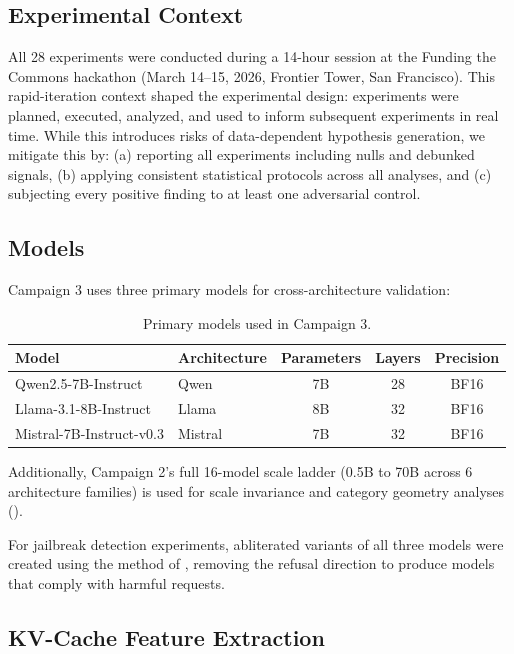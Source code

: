 \subsection{Experimental Context}

All 28 experiments were conducted during a 14-hour session at the Funding the Commons hackathon (March 14--15, 2026, Frontier Tower, San Francisco). This rapid-iteration context shaped the experimental design: experiments were planned, executed, analyzed, and used to inform subsequent experiments in real time. While this introduces risks of data-dependent hypothesis generation, we mitigate this by: (a) reporting all experiments including nulls and debunked signals, (b) applying consistent statistical protocols across all analyses, and (c) subjecting every positive finding to at least one adversarial control.

\subsection{Models}

Campaign 3 uses three primary models for cross-architecture validation:

\begin{table}[H]
\centering
\caption{Primary models used in Campaign 3.}
\label{tab:c3_models}
\begin{tabular}{llccc}
\toprule
\textbf{Model} & \textbf{Architecture} & \textbf{Parameters} & \textbf{Layers} & \textbf{Precision} \\
\midrule
Qwen2.5-7B-Instruct & Qwen & 7B & 28 & BF16 \\
Llama-3.1-8B-Instruct & Llama & 8B & 32 & BF16 \\
Mistral-7B-Instruct-v0.3 & Mistral & 7B & 32 & BF16 \\
\bottomrule
\end{tabular}
\end{table}

Additionally, Campaign 2's full 16-model scale ladder (0.5B to 70B across 6 architecture families) is used for scale invariance and category geometry analyses ().

For jailbreak detection experiments, abliterated variants of all three models were created using the method of \citet{arditi2024refusal}, removing the refusal direction to produce models that comply with harmful requests.

\subsection{KV-Cache Feature Extraction}

